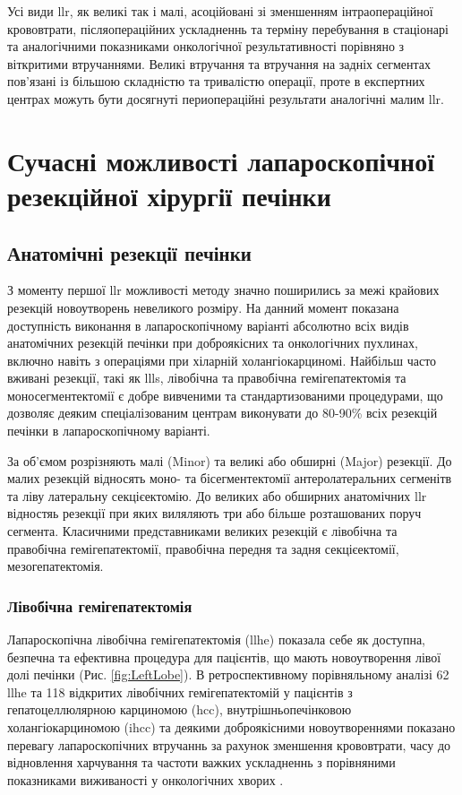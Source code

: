 \begin{refsection}
Усі види \acrshort{llr}, як великі так і малі, асоційовані зі зменшенням інтраопераційної крововтрати, післяопераційних ускладненнь та терміну перебування в стаціонарі та аналогічними показниками онкологічної результативності порівняно з віткритими втручаннями. Великі втручання та втручання на задніх сегментах пов'язані із більшою складністю та тривалістю операції, проте в експертних центрах можуть бути досягнуті периопераційні результати аналогічні малим \acrshort{llr}.


\section[Сучасні можливості]{Сучасні можливості лапароскопічної резекційної хірургії печінки}

\subsection{Анатомічні резекції печінки}
	
З моменту першої \acrshort{llr} можливості методу значно поширились за межі крайових резекцій новоутворень невеликого розміру. На данний момент показана доступність виконання в лапароскопічному варіанті абсолютно всіх видів анатомічних резекцій печінки при доброякісних та онкологічних пухлинах, включно навіть з операціями при хіларній холангіокарциномі. Найбільш часто вживані резекції, такі як \acrshort{llls}, лівобічна та правобічна гемігепатектомія та моносегментектомії є добре вивченими та стандартизованими процедурами, що дозволяє деяким спеціалізованим центрам \cite{Garbarino2019} виконувати до 80-90\% всіх резекцій печінки в лапароскопічному варіанті.

За об'ємом розрізняють малі (Minor) та великі або обширні (Major) резекції. До малих резекцій відносять моно- та бісегментектомії антеролатеральних сегменітв та ліву латеральну секцієектомію. До великих або обширних анатомічних \acrshort{llr} відностяь резекції при яких виляляють три або більше розташованих поруч сегмента. Класичними представниками великих резекцій є лівобічна та правобічна гемігепатектомії, правобічна передня та задня секцієектомії, мезогепатектомія.

\subsubsection{Лівобічна гемігепатектомія}

Лапароскопічна лівобічна гемігепатектомія (\acrshort{llhe}) показала себе як доступна, безпечна та ефективна процедура для пацієнтів, що мають новоутворення лівої долі печінки (Рис. \ref{fig:LeftLobe}). В ретроспективному порівняльному аналізі 62 \acrshort{llhe} та 118 відкритих лівобічних гемігепатектомій у пацієнтів з гепатоцеллюлярною карциномою (\acrshort{hcc}), внутрішньопечінковою холангіокарциномою (\acrshort{ihcc}) та деякими доброякісними новоутвореннями показано перевагу лапароскопічних втручаннь за рахунок зменшення крововтрати, часу до відновлення харчування та частоти важких ускладненнь з порівняними показниками виживаності у онкологічних хворих \cite{Cho2018b}.   


\end{refsection}

